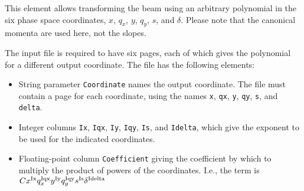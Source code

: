 This element allows transforming the beam using an arbitrary polynomial in the six phase space coordinates,
$x$, $q_x$, $y$, $q_y$, $s$, and $\delta$.
Please note that the canonical momenta are used here, not the slopes.

The input file is required to have six pages, each of which gives the polynomial for a different output coordinate.
The file has the following elements:
\begin{itemize}
\item String parameter \verb|Coordinate| names the output coordinate. The file must contain a page
      for each coordinate, using the names \verb|x|, \verb|qx|, \verb|y|, \verb|qy|, \verb|s|,
      and \verb|delta|.
\item Integer columns \verb|Ix|, \verb|Iqx|, \verb|Iy|, \verb|Iqy|, \verb|Is|, and \verb|Idelta|, which
      give the exponent to be used for the indicated coordinates.
\item Floating-point column \verb|Coefficient| giving the coefficient by which to multiply the 
      product of powers of the coordinates.
             I.e., the term is $C x^{\rm Ix} q_x^{\rm Iqx} y^{\rm Iy} q_y^{\rm Iqy}  s^{\rm Is} \delta^{\rm Idelta}$
\end{itemize}


